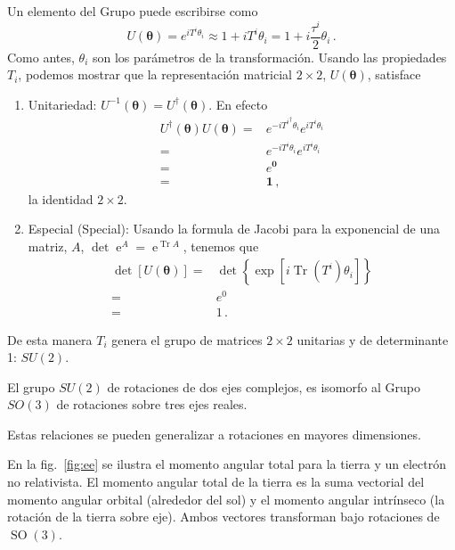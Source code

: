 \begin{frame}
Un elemento del Grupo puede escribirse como
\begin{equation}
  \label{eq:63qft}
  U(\boldsymbol{\theta})=e^{iT^i \theta_i }\approx1+iT^i\theta_i=1+i\frac{\tau^i}{2}\theta_i\,.
\end{equation}
Como antes, $\theta_i$ son los parámetros de la transformación.  Usando las propiedades $T_i$, podemos mostrar que la representación matricial $2\times 2$, $U(\boldsymbol{\theta})$, satisface
\begin{enumerate}
\item Unitariedad: $U^{-1}(\boldsymbol{\theta})=U^{\dagger}(\boldsymbol{\theta})$. En efecto
  \begin{align*}
    U^{\dagger}(\boldsymbol{\theta})U(\boldsymbol{\theta})=&e^{-i{T^i}^{\dagger} \theta_i }e^{iT^i \theta_i }\nonumber\\
=&e^{-i T^i \theta_i }e^{iT^i \theta_i } \nonumber\\
=&e^{\mathbf{0}}\nonumber\\
=&\mathbf{1}\,,
  \end{align*}
la identidad $2\times 2$.
\item Especial (Special): Usando la formula de Jacobi para la exponencial de una matriz, $A$, $\operatorname{det}\operatorname{e}^{A}=\operatorname{e}^{\operatorname{Tr}A}$, tenemos que
  \begin{align*}
   \det[U(\boldsymbol{\theta})]=&\det\left\{\exp\left[  i \operatorname{Tr}\left( T^i \right)\theta_i \right]  \right\}\nonumber\\
                           =&e^{0}\nonumber\\
                           =&1\,.
  \end{align*}
\end{enumerate}
De esta manera $T_i$ genera el grupo de matrices $2\times 2$ unitarias y de determinante 1: $SU(2)$. 
\end{frame}

El grupo $SU(2)$ de rotaciones de dos ejes complejos, es isomorfo al Grupo $SO(3)$ de rotaciones sobre tres ejes reales.

Estas relaciones se pueden generalizar a rotaciones en mayores dimensiones.

En la fig.~\ref{fig:ee} se ilustra el momento angular total para la tierra y un electrón no relativista. 
El momento angular total de la tierra es la suma vectorial del momento angular orbital (alrededor del sol) 
y el momento angular intrínseco (la rotación de la tierra sobre eje). Ambos vectores transforman bajo rotaciones de $\operatorname{SO}(3)$.

